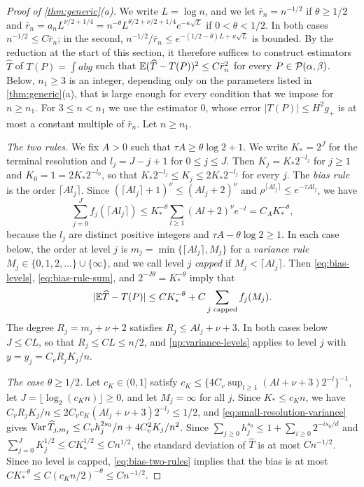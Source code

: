 \begin{proof}[Proof of \cref{thm:generic}(a)]
We write $L=\log n$, and we let $\bar r_n=n^{-1/2}$ if $\theta\ge1/2$ and
$\bar r_n=a_nL^{\nu/2+1/4}=n^{-\theta}L^{\theta/2+\nu/2+1/4}e^{-\kappa\sqrt L}$
if $0<\theta<1/2$. In both cases $n^{-1/2}\le C\bar r_n$; in the second,
$n^{-1/2}/\bar r_n\le e^{-(1/2-\theta)L+\kappa\sqrt L}$ is bounded. By the
reduction at the start of this section, it therefore suffices to
construct estimators $\widehat T$ of $T(P)=\int abg$ such that
$\mathbb E(\widehat T-T(P))^2\le C\bar r_n^2$ for every $P\in\mathcal P(\alpha,\beta)$.
Below, $n_1\ge3$ is an integer, depending only on the parameters listed
in \cref{thm:generic}(a), that is large enough for every condition
that we impose for $n\ge n_1$. For $3\le n<n_1$ we use the estimator $0$,
whose error $|T(P)|\le H^2g_+$ is at most a constant multiple of
$\bar r_n$. Let $n\ge n_1$.

\emph{The two rules.} We fix $A>0$ such that $\tau A\ge\theta\log2+1$. We
write $K_*=2^J$ for the terminal resolution and $l_j=J-j+1$ for
$0\le j\le J$. Then $K_j=K_*2^{-l_j}$ for $j\ge1$ and $K_0=1=2K_*2^{-l_0}$,
so that $K_*2^{-l_j}\le K_j\le2K_*2^{-l_j}$ for every $j$. The \emph{bias
rule} is the order $\lceil Al_j\rceil$. Since
$(\lceil Al_j\rceil+1)^\nu\le(Al_j+2)^\nu$ and
$\rho^{\lceil Al_j\rceil}\le e^{-\tau Al_j}$, we have
\begin{equation}\label{eq:bias-rule-sum}
 \sum_{j=0}^Jf_j(\lceil Al_j\rceil)
 \le K_*^{-\theta}\sum_{l\ge1}(Al+2)^\nu e^{-l}=C_AK_*^{-\theta},
\end{equation}
because the $l_j$ are distinct positive integers and
$\tau A-\theta\log2\ge1$. In each case below, the order at level $j$ is
$m_j=\min\{\lceil Al_j\rceil,M_j\}$ for a \emph{variance rule}
$M_j\in\{0,1,2,\ldots\}\cup\{\infty\}$, and we call level $j$
\emph{capped} if $M_j<\lceil Al_j\rceil$. Then \eqref{eq:bias-levels},
\eqref{eq:bias-rule-sum}, and $2^{-J\theta}=K_*^{-\theta}$ imply that
\begin{equation}\label{eq:bias-two-rules}
 |\mathbb E\widehat T-T(P)|\le CK_*^{-\theta}
   +C\sum_{j\text{ capped}}f_j(M_j).
\end{equation}
The degree $R_j=m_j+\nu+2$ satisfies $R_j\le Al_j+\nu+3$. In both cases
below $J\le CL$, so that $R_j\le CL\le n/2$, and
\eqref{up:variance-levels} applies to level $j$ with
$y=y_j=C_vR_jK_j/n$.

\emph{The case $\theta\ge1/2$.} Let $c_K\in(0,1]$ satisfy
$c_K\le\{4C_v\sup_{l\ge1}(Al+\nu+3)2^{-l}\}^{-1}$, let
$J=\lfloor\log_2(c_Kn)\rfloor\ge0$, and let $M_j=\infty$ for all $j$.
Since $K_*\le c_Kn$, we have
$C_vR_jK_j/n\le2C_vc_K(Al_j+\nu+3)2^{-l_j}\le1/2$, and
\eqref{eq:small-resolution-variance} gives
$\operatorname{Var}\widehat T_{j,m_j}\le C_vh_j^{2s_0}/n+4C_v^2K_j/n^2$. Since
$\sum_{j\ge0}h_j^{s_0}\le1+\sum_{i\ge0}2^{-is_0/d}$ and
$\sum_{j=0}^JK_j^{1/2}\le CK_*^{1/2}\le Cn^{1/2}$, the standard deviation
of $\widehat T$ is at most $Cn^{-1/2}$. Since no level is capped,
\eqref{eq:bias-two-rules} implies that the bias is at most
$CK_*^{-\theta}\le C(c_Kn/2)^{-\theta}\le Cn^{-1/2}$.


\end{proof}
